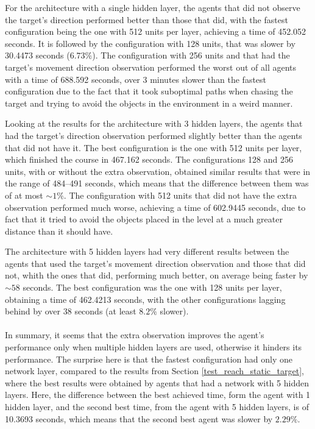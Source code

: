For the architecture with a single hidden layer, the agents that did not observe the target's direction performed better than those that did, with the fastest configuration being the one with 512 units per layer, achieving a time of 452.052 seconds. It is followed by the configuration with 128 units, that was slower by 30.4473 seconds ($6.73\%$). The configuration with 256 units and that had the target's movement direction observation performed the worst out of all agents with a time of 688.592 seconds, over 3 minutes slower than the fastest configuration due to the fact that it took suboptimal paths when chasing the target and trying to avoid the objects in the environment in a weird manner.

Looking at the results for the architecture with 3 hidden layers, the agents that had the target's direction observation performed slightly better than the agents that did not have it. The best configuration is the one with 512 units per layer, which finished the course in 467.162 seconds. The configurations 128 and 256 units, with or without the extra observation, obtained similar results that were in the range of 484--491 seconds, which means that the difference between them was of at most $\sim1\%$. The configuration with 512 units that did not have the extra observation performed much worse, achieving a time of 602.9445 seconds, due to fact that it tried to avoid the objects placed in the level at a much greater distance than it should have.

The architecture with 5 hidden layers had very different results between the agents that used the target's movement direction observation and those that did not, whith the ones that did, performing much better, on average being faster by $\sim58$ seconds. The best configuration was the one with 128 units per layer, obtaining a time of 462.4213 seconds, with the other configurations lagging behind by over 38 seconds (at least $8.2\%$ slower).

\paragraph{}
In summary, it seems that the extra observation improves the agent's performance only when multiple hidden layers are used, otherwise it hinders its performance. The surprise here is that the fastest configuration had only one network layer, compared to the results from Section \ref{test_reach_static_target}, where the best results were obtained by agents that had a network with 5 hidden layers. Here, the difference between the best achieved time, form the agent with 1 hidden layer, and the second best time, from the agent with 5 hidden layers, is of 10.3693 seconds, which means that the second best agent was slower by $2.29\%$.

